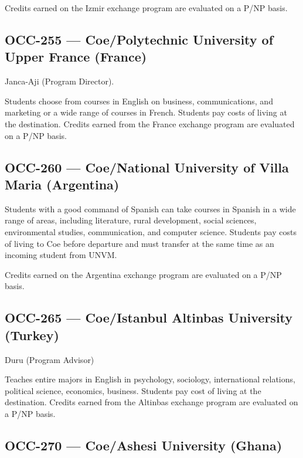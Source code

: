 \documentclass[
  letterpaper,
]{scrbook}
\begin{document}
Credits earned on the Izmir exchange program are evaluated on a P/NP
basis.

\subsection{OCC-255 --- Coe/Polytechnic University of Upper France
(France)}\label{occ-255-coepolytechnic-university-of-upper-france-france}

Janca-Aji (Program Director).

Students choose from courses in English on business, communications, and
marketing or a wide range of courses in French. Students pay costs of
living at the destination. Credits earned from the France exchange
program are evaluated on a P/NP basis.

\subsection{OCC-260 --- Coe/National University of Villa Maria
(Argentina)}\label{occ-260-coenational-university-of-villa-maria-argentina}

Students with a good command of Spanish can take courses in Spanish in a
wide range of areas, including literature, rural development, social
sciences, environmental studies, communication, and computer science.
Students pay costs of living to Coe before departure and must transfer
at the same time as an incoming student from UNVM.

Credits earned on the Argentina exchange program are evaluated on a P/NP
basis.

\subsection{OCC-265 --- Coe/Istanbul Altinbas University
(Turkey)}\label{occ-265-coeistanbul-altinbas-university-turkey}

Duru (Program Advisor)

Teaches entire majors in English in psychology, sociology, international
relations, political science, economics, business. Students pay cost of
living at the destination. Credits earned from the Altinbas exchange
program are evaluated on a P/NP basis.

\subsection{OCC-270 --- Coe/Ashesi University
(Ghana)}\label{occ-270-coeashesi-university-ghana}
\end{document}
